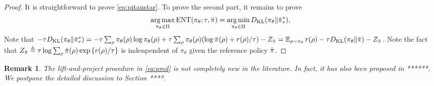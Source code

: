 \documentclass{article} %
\newtheorem{remark}{Remark}
\begin{document}
\begin{proof}
It is straightforward to prove \cref{eq:pitaustar}.
To prove the second part, it remains to prove
\begin{equation*}
\operatorname*{arg\,max}\limits_{\pi_\theta \in \Pi}{\text{ENT}(\pi_\theta; \tau, \bar{\pi})}= \operatorname*{arg\,min}\limits_{\pi_\theta \in \Pi}{ D_{\mathrm{KL}}(\pi_\theta \| \bar{\pi}_\tau^*) } ,
\end{equation*}
Note that $-\tau D_{\mathrm{KL}}(\pi_\theta \| \bar{\pi}_\tau^*) = - \tau \sum_{\rho}{ \pi_\theta(\rho) \log \pi_\theta(\rho) } + \tau \sum_{\rho}{ \pi_\theta(\rho) (\log \bar{\pi}(\rho) + r(\rho) / \tau ) }  - Z_{\bar{\pi}} = \operatorname*{\mathbb{E}}_{\rho \sim \pi_\theta}{  r(\rho)  - \tau D_{\mathrm{KL}}(\pi_\theta \| \bar{\pi}) } - Z_{\bar{\pi}}$. Note the fact that $Z_{\bar{\pi}} \triangleq \tau \log{ \sum_{\rho}{\bar{\pi}(\rho) \exp\left\{ r(\rho) / \tau \right\} } }$ is indenpendent of $\pi_\theta$ given the reference policy $\bar{\pi}$.
\end{proof}
\begin{remark}
	The lift-and-project procedure in \cref{eq:pmd} is not completely new in the literature. In fact, it has also been proposed in ******. We postpone the detailed discussion to Section ****.
\end{remark}
\end{document}
